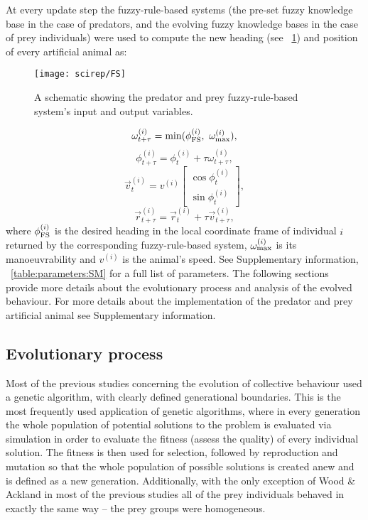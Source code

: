 At every update step the fuzzy-rule-based systems (\ie the pre-set fuzzy knowledge base in the case of predators, and the evolving fuzzy knowledge bases in the case of prey individuals) were used to compute the new heading (see \figurename~\ref{figure:FS}) and position of every artificial animal as:
%
\begin{figure}
  \texttt{[image: scirep/FS]}
  \caption{A schematic showing the predator and prey fuzzy-rule-based system's input and output variables.}
  \label{figure:FS}
\end{figure}
%
\begin{equation}
  \omega^{(i)}_{t+\tau}= \min(\phi^{(i)}_\textnormal{FS},\ \omega^{(i)}_\textnormal{max}),
\end{equation}
%
\begin{equation}
  \phi^{(i)}_{t+\tau}=\phi^{(i)}_t + \tau\omega^{(i)}_{t+\tau},
\end{equation}
%
\begin{equation}
  \vec{v}^{(i)}_t=v^{(i)}\begin{bmatrix}\cos\phi^{(i)}_t \\ \sin\phi^{(i)}_t\end{bmatrix},
\end{equation}
%
\begin{equation}
  \vec{r}^{(i)}_{t+\tau}= \vec{r}^{(i)}_t + \tau\vec{v}^{(i)}_{t+\tau},
\end{equation}
%
where $\phi^{(i)}_\textnormal{FS}$ is the desired heading in the local coordinate frame of individual $i$ returned by the corresponding fuzzy-rule-based system, $\omega^{(i)}_\textnormal{max}$ is its manoeuvrability and $v^{(i)}$ is the animal's speed. See Supplementary information, \tablename~\ref{table:parameters:SM}
for a full list of parameters. The following sections provide more details about the evolutionary process and analysis of the evolved behaviour. For more details about the implementation of the predator and prey artificial animal see Supplementary information.

\subsection{Evolutionary process}

Most of the previous studies concerning the evolution of collective behaviour \cite{kunz2006prey,olson2013predator,olson2016evolution,wood2007evolving} used a genetic algorithm, with clearly defined generational boundaries. This is the most frequently used application of genetic algorithms, where in every generation the whole population of potential solutions to the problem is evaluated via simulation in order to evaluate the fitness (assess the quality) of every individual solution. The fitness is then used for selection, followed by reproduction and mutation so that the whole population of possible solutions is created anew and is defined as a new generation. Additionally, with the only exception of Wood \& Ackland \cite{wood2007evolving} in most of the previous studies \cite{kunz2006prey,olson2013predator,olson2016evolution} all of the prey individuals behaved in exactly the same way -- the prey groups were homogeneous.

